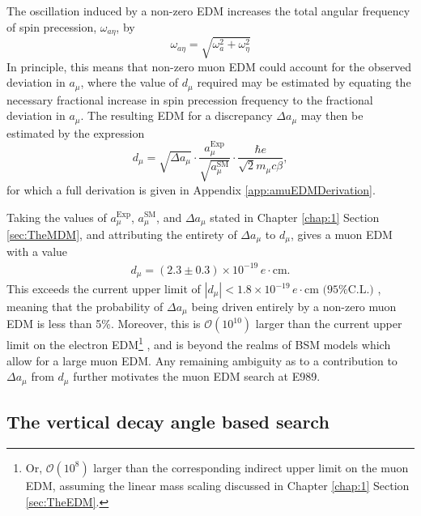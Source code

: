 The oscillation induced by a non-zero EDM increases the total angular frequency of spin precession, $\omega_{a\eta}$, by
%
\begin{equation} 
  \omega_{a\eta} = \sqrt{\omega_{a}^{2}+\omega_{\eta}^{2}} 
\label{eqn:omega_aeta}
\end{equation}
%
In principle, this means that non-zero muon EDM could account for the observed deviation in $a_{\mu}$, where the value of $d_{\mu}$ required may be estimated by equating the necessary fractional increase in spin precession frequency to the fractional deviation in $a_{\mu}$. The resulting EDM for a discrepancy $\Delta a_{\mu}$ may then be estimated by the expression
%
\begin{equation}
    d_{\mu} = \sqrt{\Delta a_{\mu}}\cdot \frac{a_{\mu}^{\text{Exp}}}{\sqrt{a_{\mu}^{\text{SM}}}} \cdot\frac{\hbar e }{\sqrt{2}m_{\mu} c \beta },
    \label{eqn:dmu_shift}
\end{equation}
%
for which a full derivation is given in Appendix \ref{app:amuEDMDerivation}. 

Taking the values of $a_{\mu}^{\text{Exp}}$, $a_{\mu}^{\text{SM}}$, and $\Delta a_{\mu}$ stated in Chapter \ref{chap:1} Section \ref{sec:TheMDM}, and attributing the entirety of $\Delta a_{\mu}$ to $d_{\mu}$, gives a muon EDM with a value 
%
\begin{align*}
d_{\mu} = (2.3\pm0.3)\times10^{-19}\,e\cdot\text{cm}.
\end{align*} 
%
This exceeds the current upper limit of $|d_{\mu}| < 1.8\times10^{-19}\,e\cdot\text{cm}\text{ (95\% C.L.)}$ \cite{BNLEDM}, meaning that the probability of $\Delta a_{\mu}$ being driven entirely by a non-zero muon EDM is less than 5\%. Moreover, this is $\mathcal{O}(10^{10})$ larger than the current upper limit on the electron EDM\footnote{Or, $\mathcal{O}(10^{8})$ larger than the corresponding indirect upper limit on the muon EDM, assuming the linear mass scaling discussed in Chapter \ref{chap:1} Section \ref{sec:TheEDM}.} \cite{ImprovedElectronEDMLimit}, and is beyond the realms of BSM models which allow for a large muon EDM. Any remaining ambiguity as to a contribution to $\Delta a_{\mu}$ from $d_{\mu}$ further motivates the muon EDM search at E989.

\subsection{The vertical decay angle based search}\label{subsec:VerticalAngleBasedSearch}

